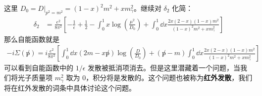 这里 $D_0 = D|_{p^2=m^2}=(1-x)^2 m^2+x m_\gamma^2 $。继续对 $\delta_2$ 化简：
\begin{equation}
\begin{aligned}
\delta_2 &= \frac{e^2}{8\pi^2}\left[-\frac{1}{\epsilon}+\frac{1}{2}-\int_0^1 x\log\left(\frac{\mu^2}{D_0} \right) 
+\int_0^1\dd{x} \frac{2x(2-x)(1-x)m^2}{(1-x)^2m^2+xm_\gamma^2}
\right]
\end{aligned}
\end{equation}
那么自能函数就是
\begin{equation}
\begin{aligned}
-i\Sigma(\not p)=i\frac{e^2}{8\pi^2}\left[\int_0^1\dd x(2m-x\not p)\log\left(\frac{D}{D_0}\right)+(\not p-m)\int_0^1\dd{x}\frac{2x(2-x)(1-x)m^2}{(1-x)^2m^2+xm_\gamma^2} \right]
\end{aligned}
\end{equation}
可以看到自能函数中的 $1/\epsilon$ 发散被抵消项消去。但是这里潜藏着一个问题，当我们将光子质量项 $m_\gamma^2$ 取为 $0$，积分将是发散的。这个问题也被称为\textbf{红外发散}，我们将在红外发散的词条中具体讨论这个问题。
